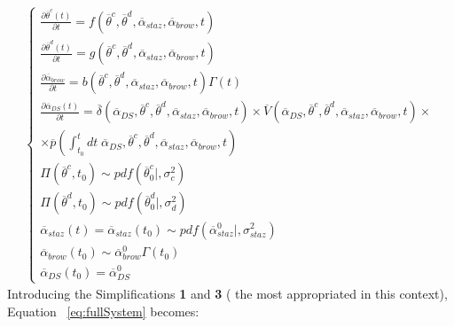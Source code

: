 \begin{equation}
\label{eq:fullSystem}
\begin{split}
\left\{\begin{matrix}
\frac{\partial  \overline{\theta}^{c}\left ( t \right )}{\partial t}=f\left ( \overline{\theta}^{c},\overline{\theta}^{d}, \overline{\alpha}_{staz} ,\overline{\alpha}_{brow},      t \right ) \\ 
\frac{\partial  \overline{\theta}^{d}\left ( t \right )}{\partial t}=g\left ( \overline{\theta}^{c},\overline{\theta}^{d},\overline{\alpha}_{staz},\overline{\alpha}_{brow},t \right )\\
\frac{\partial \overline{\alpha}_{brow} }{\partial t}=b\left ( \overline{\theta}^{c},\overline{\theta}^{d},\overline{\alpha}_{staz},\overline{\alpha}_{brow},t \right )\Gamma \left ( t \right ) \\
\frac{\partial  \overline{\alpha }_{DS}\left ( t \right )}{\partial t}=  \overline{\delta}\left ( \overline{\alpha }_{DS}, \overline{\theta}^{c},\overline{\theta}^{d},\overline{\alpha}_{staz},\overline{\alpha}_{brow},t \right ) \times \overline{V}\left ( \overline{\alpha }_{DS}, \overline{\theta}^{c},\overline{\theta}^{d},\overline{\alpha}_{staz},\overline{\alpha}_{brow},t \right ) \times 
\\ \times  \overline{p}\left ( \int_{t_{0}}^{t}  dt\;   \overline{\alpha }_{DS}, \overline{\theta}^{c},\overline{\theta}^{d},
  \overline{ \alpha}_{staz},\overline{\alpha}_{brow},t \right )
\\
\Pi \left ( \overline{\theta}^{c},t_{0} \right ) \sim pdf\left ( \overline{\theta}^{c}_{0}|,\sigma_{c}^{2} \right )\\ 
\Pi \left ( \overline{\theta}^{d},t_{0} \right ) \sim pdf\left ( \overline{\theta}^{d}_{0}|,\sigma_{d}^{2} \right ) \\
\overline{\alpha}_{staz}\left ( t \right )=\overline{\alpha}_{staz}\left ( t_{0} \right ) \sim pdf\left ( \overline{\alpha}_{staz}^{0}|, \sigma_{staz}^{2} \right ) \\
\overline{\alpha}_{brow}\left ( t_{0} \right ) \sim  \overline{\alpha}_{brow}^{0} \Gamma \left ( t_{0} \right ) \\
\overline{\alpha}_{DS} \left ( t_{0} \right ) = \overline{\alpha}_{DS} ^{0}
\end{matrix}\right.
\end{split}
\end{equation}
Introducing the Simplifications \textbf{1} and \textbf{3} ( the most 
appropriated in this context), Equation ~\ref{eq:fullSystem} becomes:
